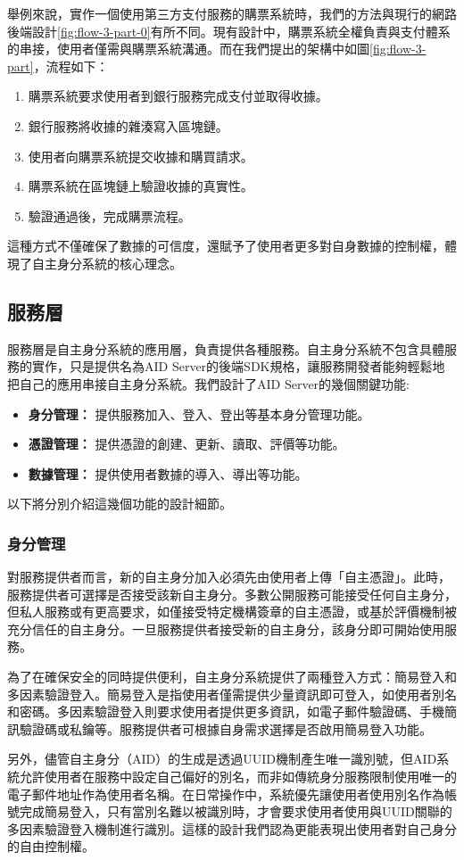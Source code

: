舉例來說，實作一個使用第三方支付服務的購票系統時，我們的方法與現行的網路後端設計\ref{fig:flow-3-part-0}有所不同。現有設計中，購票系統全權負責與支付體系的串接，使用者僅需與購票系統溝通。而在我們提出的架構中如圖\ref{fig:flow-3-part}，流程如下：
\begin{enumerate}
  \item 購票系統要求使用者到銀行服務完成支付並取得收據。
  \item 銀行服務將收據的雜湊寫入區塊鏈。
  \item 使用者向購票系統提交收據和購買請求。
  \item 購票系統在區塊鏈上驗證收據的真實性。
  \item 驗證通過後，完成購票流程。
\end{enumerate}
這種方式不僅確保了數據的可信度，還賦予了使用者更多對自身數據的控制權，體現了自主身分系統的核心理念。
\subsection{服務層}
服務層是自主身分系統的應用層，負責提供各種服務。自主身分系統不包含具體服務的實作，只是提供名為AID Server的後端SDK規格，讓服務開發者能夠輕鬆地把自己的應用串接自主身分系統。我們設計了AID Server的幾個關鍵功能:
\begin{itemize}
  \item \textbf{身分管理：} 提供服務加入、登入、登出等基本身分管理功能。
  \item \textbf{憑證管理：} 提供憑證的創建、更新、讀取、評價等功能。
  \item \textbf{數據管理：} 提供使用者數據的導入、導出等功能。
\end{itemize}
以下將分別介紹這幾個功能的設計細節。
\subsubsection{身分管理}
對服務提供者而言，新的自主身分加入必須先由使用者上傳「自主憑證」。此時，服務提供者可選擇是否接受該新自主身分。多數公開服務可能接受任何自主身分，但私人服務或有更高要求，如僅接受特定機構簽章的自主憑證，或基於評價機制被充分信任的自主身分。一旦服務提供者接受新的自主身分，該身分即可開始使用服務。

為了在確保安全的同時提供便利，自主身分系統提供了兩種登入方式：簡易登入和多因素驗證登入。簡易登入是指使用者僅需提供少量資訊即可登入，如使用者別名和密碼。多因素驗證登入則要求使用者提供更多資訊，如電子郵件驗證碼、手機簡訊驗證碼或私鑰等。服務提供者可根據自身需求選擇是否啟用簡易登入功能。

另外，儘管自主身分（AID）的生成是透過UUID機制\cite{uuid}產生唯一識別號，但AID系統允許使用者在服務中設定自己偏好的別名，而非如傳統身分服務限制使用唯一的電子郵件地址作為使用者名稱。在日常操作中，系統優先讓使用者使用別名作為帳號完成簡易登入，只有當別名難以被識別時，才會要求使用者使用與UUID關聯的多因素驗證登入機制進行識別。這樣的設計我們認為更能表現出使用者對自己身分的自由控制權。


